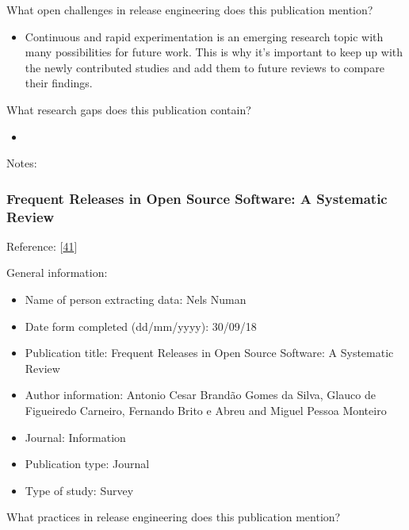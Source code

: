 \documentclass[]{book}
\providecommand{\tightlist}{%
  \setlength{\itemsep}{0pt}\setlength{\parskip}{0pt}}
\begin{document}
What open challenges in release engineering does this publication
mention?

\begin{itemize}
\tightlist
\item
  Continuous and rapid experimentation is an emerging research topic
  with many possibilities for future work. This is why it's important to
  keep up with the newly contributed studies and add them to future
  reviews to compare their findings.
\end{itemize}

What research gaps does this publication contain?

\begin{itemize}
\item
\end{itemize}

Notes:

\subsubsection{Frequent Releases in Open Source Software: A Systematic
Review}\label{frequent-releases-in-open-source-software-a-systematic-review}

Reference: {[}\protect\hyperlink{ref-cesar2017a}{41}{]}

General information:

\begin{itemize}
\tightlist
\item
  Name of person extracting data: Nels Numan
\item
  Date form completed (dd/mm/yyyy): 30/09/18
\item
  Publication title: Frequent Releases in Open Source Software: A
  Systematic Review
\item
  Author information: Antonio Cesar Brandão Gomes da Silva, Glauco de
  Figueiredo Carneiro, Fernando Brito e Abreu and Miguel Pessoa Monteiro
\item
  Journal: Information
\item
  Publication type: Journal
\item
  Type of study: Survey
\end{itemize}

What practices in release engineering does this publication mention?
\end{document}
